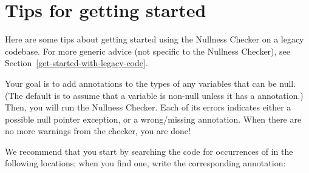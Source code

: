 \section{Tips for getting started\label{nullness-getting-started}}

Here are some tips about getting started using the Nullness Checker on a
legacy codebase.  For more generic advice (not specific to the Nullness
Checker), see Section~\ref{get-started-with-legacy-code}.

Your goal is to add  annotations
to the types of any variables that can be null.  (The default is to assume
that a variable is non-null unless it has a  annotation.)
Then, you will run the Nullness Checker.  Each of its errors indicates
either a possible null pointer exception, or a wrong/missing annotation.
When there are no more warnings from the checker, you are done!

We recommend that you start by searching the code for occurrences of
 in the following locations; when you find one, write the
corresponding annotation:


